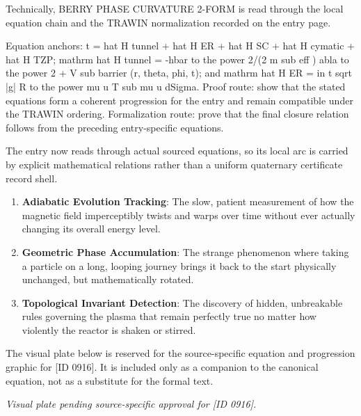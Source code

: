 Technically, BERRY PHASE CURVATURE 2-FORM is read through the local equation chain and the TRAWIN normalization recorded on the entry page.

Equation anchors: t = hat H tunnel + hat H ER + hat H SC + hat H cymatic + hat H TZP; mathrm hat H tunnel = -hbar to the power 2/(2 m sub eff ) abla to the power 2 + V sub barrier (r, theta, phi, t); and mathrm hat H ER = in t sqrt |g| R to the power mu u T sub mu u dSigma. Proof route: show that the stated equations form a coherent progression for the entry and remain compatible under the TRAWIN ordering. Formalization route: prove that the final closure relation follows from the preceding entry-specific equations.

The entry now reads through actual sourced equations, so its local arc is carried by explicit mathematical relations rather than a uniform quaternary certificate record shell.
\endgroup

\begin{enumerate}[leftmargin=1.6em,itemsep=6pt,topsep=4pt]
\item \textbf{Adiabatic Evolution Tracking}: The slow, patient measurement of how the magnetic field imperceptibly twists and warps over time without ever actually changing its overall energy level.
\item \textbf{Geometric Phase Accumulation}: The strange phenomenon where taking a particle on a long, looping journey brings it back to the start physically unchanged, but mathematically rotated.
\item \textbf{Topological Invariant Detection}: The discovery of hidden, unbreakable rules governing the plasma that remain perfectly true no matter how violently the reactor is shaken or stirred.
\end{enumerate}

\begingroup\footnotesize\sloppy
The visual plate below is reserved for the source-specific equation and progression graphic for [ID 0916]. It is included only as a companion to the canonical equation, not as a substitute for the formal text.
\par\endgroup
\begingroup\footnotesize\itshape
Visual plate pending source-specific approval for [ID 0916].
\par\endgroup

